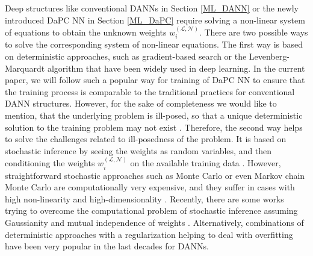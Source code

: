 \documentclass[a4paper,fleqn]{article}
\newcommand{\rw}[1]{\textcolor{blue}{#1}}
\newcommand{\del}[1]{\textcolor{red}{\sout{#1}}}
\renewcommand{\del}[1]{}
\renewcommand{\rw}[1]{#1}
\begin{document}
Deep structures like conventional DANNs in Section \ref{ML_DANN} or the newly introduced DaPC NN in Section \ref{ML_DaPC} require solving a non-linear system of equations to obtain the unknown weights $w^{(\mathcal{L},\mathcal{N})}_{i}$. There are two possible ways to solve the corresponding system of non-linear equations. The first way is based on deterministic approaches, such as gradient-based search \cite{ruder2017overview} or the Levenberg-Marquardt algorithm \cite{marquardt1963} \rw{that have been widely used in deep learning}. \rw{In the current paper, we will follow such a popular way for training of DaPC NN to ensure that the training process is comparable to the traditional practices for conventional DANN structures.} However, \rw{for the sake of completeness we would like to mention, that} the underlying problem is ill-posed, so that a unique deterministic solution to the training problem may not exist \cite{Adler_2017,yee1993ill}. Therefore, the second way helps to solve the challenges related to ill-\rw{posedness }\del{possess} of the problem. It is based on stochastic inference \cite{kolmogorov2018foundations} by seeing the weights as random variables, and then conditioning the weights $w^{(\mathcal{L},\mathcal{N})}_{i}$ on the available training data \cite{praditia2022learning}.  However, straightforward stochastic approaches such as Monte Carlo \cite{Smith1992} or even Markov chain Monte Carlo \cite{Gilks1996} are computationally very expensive, and they suffer in cases with high non-linearity and high-dimensionality \cite{papamarkou2021challenges}. Recently, there are some works trying to overcome the computational problem of stochastic inference assuming Gaussianity and mutual independence of weights \cite{blundell2015bnn}.  Alternatively, combinations of deterministic approaches with a regularization helping to deal with overfitting \cite{Goodfellow2016deeplearning} have \del{showed reasonably acceptable results and have} been very popular in the last decades for DANNs.
\end{document}
